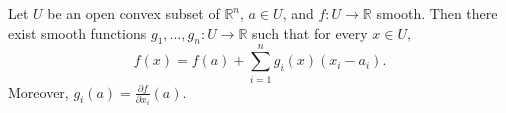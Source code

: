 Let $U$ be an open convex subset of $\mathbb{R}^n$, $a \in U$, and $f: U \to \mathbb{R}$ smooth. Then there exist smooth functions $g_1, \ldots, g_n: U \to \mathbb{R}$ such that for every $x \in U$,
$$f(x) = f(a) + \sum_{i=1}^{n} g_i(x)(x_i - a_i).$$
Moreover, $g_i(a) = \frac{\partial f}{\partial x_i}(a)$.
